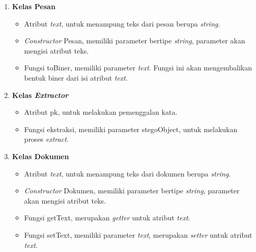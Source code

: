 \begin{enumerate}
	\item \textbf{Kelas Pesan}
	\begin{itemize}
		\item Atribut \textit{text}, untuk menampung teks dari pesan berupa \textit{string}.
		\item \textit{Constructor} Pesan, memiliki parameter bertipe \textit{string}, parameter akan mengisi atribut teks.
		\item Fungsi toBiner, memiliki parameter \textit{text}. Fungsi ini akan mengembalikan bentuk biner dari isi atribut \textit{text}.
	\end{itemize}
	
	\item \textbf{Kelas \textit{Extractor}}
	\begin{itemize}
		\item Atribut pk, untuk melakukan pemenggalan kata.
		\item Fungsi ekstraksi, memiliki parameter stegoObject, untuk melakukan proses \textit{extract}.
	\end{itemize}

	\item \textbf{Kelas Dokumen}
	\begin{itemize}
		\item Atribut \textit{text}, untuk menampung teks dari dokumen berupa \textit{string}.
		\item \textit{Constructor} Dokumen, memiliki parameter bertipe \textit{string}, parameter akan mengisi atribut teks.
		\item Fungsi getText, merupakan \textit{getter} untuk atribut \textit{text}.
		\item Fungsi setText, memiliki parameter \textit{text}, merupakan \textit{setter} untuk atribut \textit{text}.		
	\end{itemize}
	
\end{enumerate}